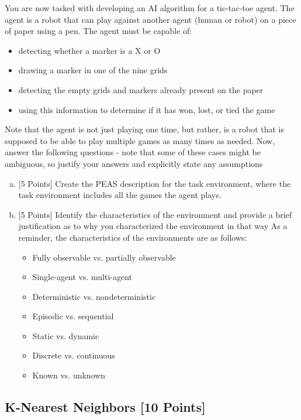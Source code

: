 \documentclass{homework}
\begin{document}
You are now tasked with developing an AI algorithm for a tic-tac-toe agent. The agent is a robot that can play against another agent (human or robot) on a piece of paper using a pen. The agent must be capable of:
\begin{itemize}[noitemsep]
    \item detecting whether a marker is a X or O
    \item drawing a marker in one of the nine grids
    \item detecting the empty grids and markers already present on the paper
    \item using this information to determine if it has won, lost, or tied the game
\end{itemize}
Note that the agent is not just playing one time, but rather, is a robot that is supposed to be able to play multiple games as many times as needed.
Now, answer the following questions - note that some of these cases might be ambiguous, so justify your answers and explicitly state any assumptions
\begin{enumerate}[(a)]
    \item {[5 Points]} Create the PEAS description for the task environment, where the task environment includes all the games the agent plays. 
    \vspace{5in}
    \item {[5 Points]} Identify the characteristics of the environment and provide a brief justification as to why you characterized the environment in that way   \newline
    As a reminder, the characteristics of the environments are as follows:
    \begin{itemize}[noitemsep]
        \item Fully observable vs. partially observable
        \item Single-agent vs. multi-agent 
        \item Deterministic vs. nondeterministic 
        \item Episodic vs. sequential
        \item Static vs. dynamic 
        \item Discrete vs. continuous 
        \item Known vs. unknown
    \end{itemize} 
    \vspace{5in}
\end{enumerate}

\newpage
\subsection{K-Nearest Neighbors [10 Points]}
\end{document}
